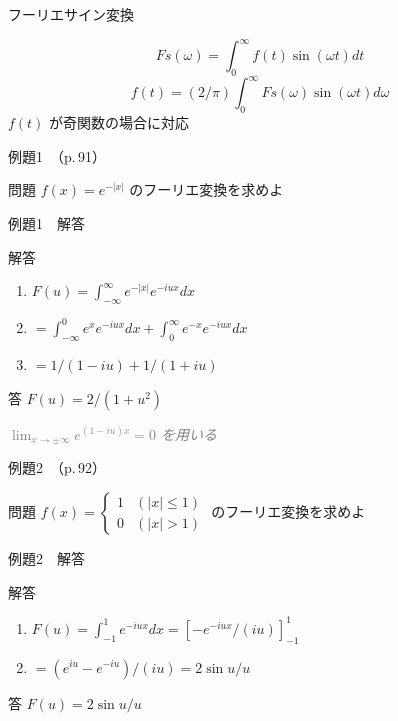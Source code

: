 \documentclass[aspectratio=43,professionalfonts,handout]{beamer}
\begin{document}
\begin{frame}{フーリエサイン変換}
  \begin{block}{}
  \[
    Fs(\omega) = \int_{0}^\infty f(t)\sin(\omega t) dt
  \]
  \[
    f(t) = (2/\pi) \int_{0}^\infty Fs(\omega)\sin(\omega t) d\omega
  \]
  {\footnotesize $f(t)$ が奇関数の場合に対応}
  \end{block}
\end{frame}

\begin{frame}{例題1　（p.\,91）}
  \begin{exampleblock}{問題}
    $f(x) = e^{-|x|}$ のフーリエ変換を求めよ\\[2pt]
  \end{exampleblock}
\end{frame}

\begin{frame}{例題1　解答}
  \begin{exampleblock}{解答}
  \begin{enumerate}[1.]
    \item[] $F(u) = \int_{-\infty}^{\infty} e^{-|x|} e^{-iux} dx$
    \item[] $= \int_{-\infty}^{0} e^{x} e^{-iux} dx + \int_{0}^{\infty} e^{-x} e^{-iux} dx$
    \item[] $= 1/(1-iu) + 1/(1+iu)$
  \end{enumerate}
  \end{exampleblock}
  \begin{alertblock}{答}
    $F(u) = 2/(1+u^{2})$
  \end{alertblock}
  {\footnotesize \textcolor{gray}{\textit{$\lim_{x \to ±\infty} e^{(1-iu)x} = 0$ を用いる}}}
\end{frame}

\begin{frame}{例題2　（p.\,92）}
  \begin{exampleblock}{問題}
    $f(x) = \begin{cases} 1 & (|x| \leq 1) \\ 0 & (|x| > 1) \end{cases}$ のフーリエ変換を求めよ\\[2pt]
  \end{exampleblock}
\end{frame}

\begin{frame}{例題2　解答}
  \begin{exampleblock}{解答}
  \begin{enumerate}[1.]
    \item[] $F(u) = \int_{-1}^{1} e^{-iux} dx = [-e^{-iux}/(iu)]_{-1}^{1}$
    \item[] $= (e^{iu} - e^{-iu})/(iu) = 2\sin u / u$
  \end{enumerate}
  \end{exampleblock}
  \begin{alertblock}{答}
    $F(u) = 2\sin u / u$
  \end{alertblock}
\end{frame}
\end{document}
